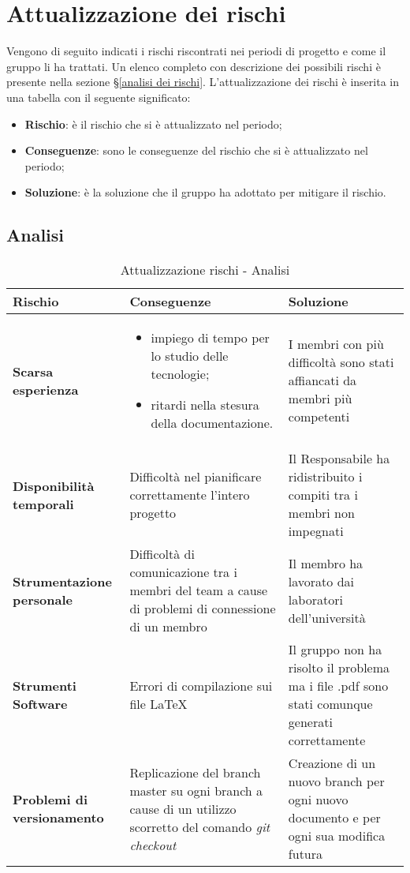 \section{Attualizzazione dei rischi}
\label{Attuazione rischi}
Vengono di seguito indicati i rischi riscontrati nei periodi di progetto e come il gruppo li ha
trattati. Un elenco completo con descrizione dei possibili rischi è presente nella sezione §\ref{analisi dei rischi}.
L'attualizzazione dei rischi è inserita in una tabella con il seguente significato:
\begin{itemize}
	\item \textbf{Rischio}: è il rischio che si è attualizzato nel periodo;
	\item \textbf{Conseguenze}: sono le conseguenze del rischio che si è attualizzato nel periodo;
	\item \textbf{Soluzione}: è la soluzione che il gruppo ha adottato per mitigare il rischio.
\end{itemize}

\subsection{Analisi}
\begin{table}[htbp]
	\centering
	\begin{tabular}{| p{3cm} | p{6cm} | p{6cm} |}
		\hline
		\textbf{Rischio} & \textbf{Conseguenze} & \textbf{Soluzione} \\
		\hline
		\textbf{Scarsa esperienza} &  \begin{itemize}
								\item impiego di tempo per lo studio delle tecnologie;
								\item ritardi nella stesura della documentazione.
							\end{itemize} & I membri con più difficoltà sono stati affiancati da membri più competenti	 \\ \hline
		\textbf{Disponibilità temporali} & Difficoltà nel pianificare correttamente l'intero progetto & Il Responsabile ha ridistribuito i compiti tra i membri non impegnati 		 \\ \hline
		\textbf{Strumentazione personale} & Difficoltà di comunicazione tra i membri del team a cause di problemi di connessione di un membro & Il membro ha lavorato dai laboratori dell'università \\ \hline
		\textbf{Strumenti Software} & Errori di compilazione sui file \LaTeX{} & Il gruppo non ha risolto il problema ma i file .pdf sono stati comunque generati correttamente \\ \hline
		\textbf{Problemi di versionamento} & Replicazione del branch master su ogni branch a cause di un utilizzo scorretto del comando \textit{git checkout} & Creazione di un nuovo branch per ogni nuovo documento e per ogni sua modifica futura \\
		\hline
	\end{tabular}
	\caption[Attualizzazione rischi - Analisi]{Attualizzazione rischi - Analisi}
\end{table}
\newpage

